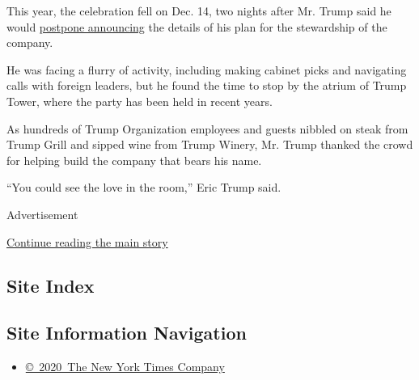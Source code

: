 This year, the celebration fell on Dec. 14, two nights after Mr. Trump
said he would
\href{https://www.nytimes.com/2016/12/12/us/politics/donald-trump-postpones-announcement-on-business-conflicts.html}{postpone
announcing} the details of his plan for the stewardship of the company.

He was facing a flurry of activity, including making cabinet picks and
navigating calls with foreign leaders, but he found the time to stop by
the atrium of Trump Tower, where the party has been held in recent
years.

As hundreds of Trump Organization employees and guests nibbled on steak
from Trump Grill and sipped wine from Trump Winery, Mr. Trump thanked
the crowd for helping build the company that bears his name.

``You could see the love in the room,'' Eric Trump said.

Advertisement

\protect\hyperlink{after-bottom}{Continue reading the main story}

\hypertarget{site-index}{%
\subsection{Site Index}\label{site-index}}

\hypertarget{site-information-navigation}{%
\subsection{Site Information
Navigation}\label{site-information-navigation}}

\begin{itemize}
\tightlist
\item
  \href{https://help.nytimes.com/hc/en-us/articles/115014792127-Copyright-notice}{©~2020~The
  New York Times Company}
\end{itemize}

